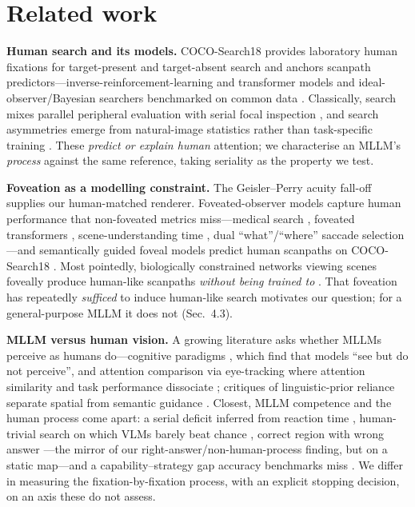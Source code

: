 \documentclass[runningheads]{llncs}
\begin{document}
\section{Related work}

\textbf{Human search and its models.} COCO-Search18 provides laboratory human fixations for target-present
and target-absent search \cite{chen2021cocosearch18,chen2022targetabsent} and anchors scanpath
predictors---inverse-reinforcement-learning and transformer models
\cite{yang2020irl,yang2024hat,mondal2023gazeformer} and ideal-observer/Bayesian searchers benchmarked on
common data \cite{bujia2022bayes,travi2022bench}. Classically, search mixes parallel peripheral evaluation
with serial focal inspection \cite{heaton2020serial}, and search asymmetries emerge from natural-image
statistics rather than task-specific training \cite{gupta2022asymmetry}. These \emph{predict or explain
human} attention; we characterise an MLLM's \emph{process} against the same reference, taking seriality as
the property we test.

\textbf{Foveation as a modelling constraint.} The Geisler--Perry acuity fall-off \cite{geisler1998foveation}
supplies our human-matched renderer. Foveated-observer models capture human performance that non-foveated
metrics miss---medical search \cite{lago2021foveated}, foveated transformers \cite{jonna2022foveatedvit},
scene-understanding time \cite{wen2025fsum}, dual ``what''/``where'' saccade selection
\cite{dauce2020dual}---and semantically guided foveal models predict human scanpaths on COCO-Search18
\cite{luzio2024semantic,luzio2025semba}. Most pointedly, biologically constrained networks viewing scenes
foveally produce human-like scanpaths \emph{without being trained to} \cite{neva,nevaclip}. That foveation
has repeatedly \emph{sufficed} to induce human-like search motivates our question; for a general-purpose
MLLM it does not (Sec.~4.3).

\textbf{MLLM versus human vision.} A growing literature asks whether MLLMs perceive as humans
do---cognitive paradigms \cite{burden2025ispy,lin2024hvsbench,blink,tet}, which find that models ``see but do
not perceive'', and attention comparison via eye-tracking \cite{ghamati2025whichai,soodMRC,vqamhug} where
attention similarity and task performance dissociate \cite{soodMRC}; critiques of linguistic-prior reliance
separate spatial from semantic guidance \cite{kanade2025doyousee,wu2025indoor}. Closest, MLLM competence
and the human process come apart: a serial deficit inferred from reaction time \cite{budny}, human-trivial
search on which VLMs barely beat chance \cite{berman2025tunnelvision}, correct region with wrong answer
\cite{knowwheretolook}---the mirror of our right-answer/non-human-process finding, but on a static
map---and a capability--strategy gap accuracy benchmarks miss \cite{bayesbench}. We differ in measuring the
fixation-by-fixation process, with an explicit stopping decision, on an axis these do not assess.
\end{document}
